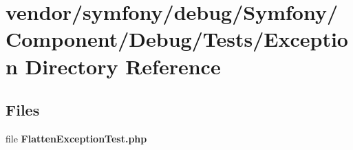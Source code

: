 \section{vendor/symfony/debug/\+Symfony/\+Component/\+Debug/\+Tests/\+Exception Directory Reference}
\label{dir_36d603dde18dca181f491d09b3ee1a66}
\subsection*{Files}
\begin{DoxyCompactItemize}
\item 
file {\bf Flatten\+Exception\+Test.\+php}
\end{DoxyCompactItemize}
